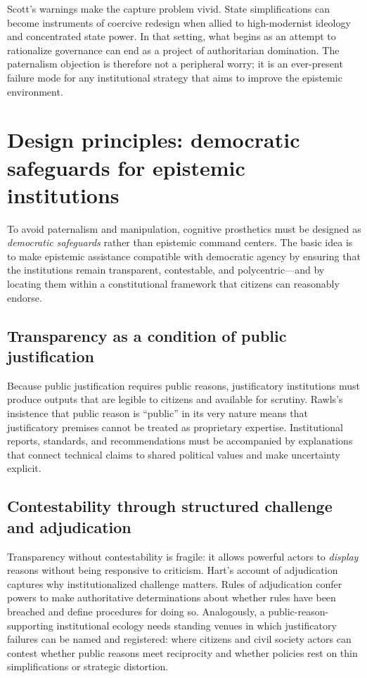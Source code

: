 \documentclass[12pt]{report}
\begin{document}
Scott’s warnings make the capture problem vivid.
State simplifications can become instruments of coercive redesign when allied to high-modernist ideology and concentrated state power. \parencite[pp.~4--5]{scott1998seeing}
In that setting, what begins as an attempt to rationalize governance can end as a project of authoritarian domination.
The paternalism objection is therefore not a peripheral worry; it is an ever-present failure mode for any institutional strategy that aims to improve the epistemic environment.

\section{Design principles: democratic safeguards for epistemic institutions}

To avoid paternalism and manipulation, cognitive prosthetics must be designed as \emph{democratic safeguards} rather than epistemic command centers.
The basic idea is to make epistemic assistance compatible with democratic agency by ensuring that the institutions remain transparent, contestable, and polycentric---and by locating them within a constitutional framework that citizens can reasonably endorse.

\subsection{Transparency as a condition of public justification}

Because public justification requires public reasons, justificatory institutions must produce outputs that are legible to citizens and available for scrutiny. \parencite[p.~10]{quong2011liberalism}
Rawls’s insistence that public reason is \enquote{public} in its very nature means that justificatory premises cannot be treated as proprietary expertise.
Institutional reports, standards, and recommendations must be accompanied by explanations that connect technical claims to shared political values and make uncertainty explicit. \parencite[p.~767]{rawls1997public}

\subsection{Contestability through structured challenge and adjudication}

Transparency without contestability is fragile: it allows powerful actors to \emph{display} reasons without being responsive to criticism.
Hart’s account of adjudication captures why institutionalized challenge matters. 
Rules of adjudication confer powers to make authoritative determinations about whether rules have been breached and define procedures for doing so. \parencite[p.~97]{hart2012concept}
Analogously, a public-reason-supporting institutional ecology needs standing venues in which justificatory failures can be named and registered: where citizens and civil society actors can contest whether public reasons meet reciprocity and whether policies rest on thin simplifications or strategic distortion.
\end{document}
